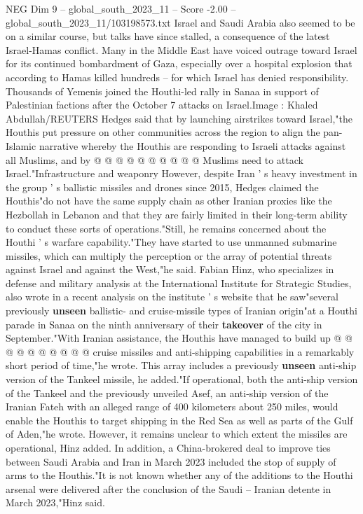 \begin{textsample}{NEG Dim 9 – global\_south\_2023\_11 – Score -2.00 – global\_south\_2023\_11/103198573.txt}
Israel and Saudi Arabia also seemed to be on a similar course, but talks have since stalled, a consequence of the latest Israel-Hamas conflict.
Many in the Middle East have voiced outrage toward Israel for its continued bombardment of Gaza, especially over a hospital explosion that according to Hamas killed hundreds -- for which Israel has denied responsibility.
Thousands of Yemenis joined the Houthi-led rally in Sanaa in support of Palestinian factions after the October 7 attacks on Israel.Image : Khaled Abdullah/REUTERS Hedges said that by launching airstrikes toward Israel,"the Houthis put pressure on other communities across the region to align the pan-Islamic narrative whereby the Houthis are responding to Israeli attacks against all Muslims, and by @ @ @ @ @ @ @ @ @ @ Muslims need to attack Israel."Infrastructure and weaponry However, despite Iran ' s heavy investment in the group ' s ballistic missiles and drones since 2015, Hedges claimed the Houthis"do not have the same supply chain as other Iranian proxies like the Hezbollah in Lebanon and that they are fairly limited in their long-term ability to conduct these sorts of operations."Still, he remains concerned about the Houthi ' s warfare capability."They have started to use unmanned submarine missiles, which can multiply the perception or the array of potential threats against Israel and against the West,"he said.
Fabian Hinz, who specializes in defense and military analysis at the International Institute for Strategic Studies, also wrote in a recent analysis on the institute ' s website that he saw"several previously \textbf{unseen} ballistic- and cruise-missile types of Iranian origin"at a Houthi parade in Sanaa on the ninth anniversary of their \textbf{takeover} of the city in September."With Iranian assistance, the Houthis have managed to build up @ @ @ @ @ @ @ @ @ @ cruise missiles and anti-shipping capabilities in a remarkably short period of time,"he wrote.
This array includes a previously \textbf{unseen} anti-ship version of the Tankeel missile, he added."If operational, both the anti-ship version of the Tankeel and the previously unveiled Asef, an anti-ship version of the Iranian Fateh with an alleged range of 400 kilometers about 250 miles, would enable the Houthis to target shipping in the Red Sea as well as parts of the Gulf of Aden,"he wrote.
However, it remains unclear to which extent the missiles are operational, Hinz added.
In addition, a China-brokered deal to improve ties between Saudi Arabia and Iran in March 2023 included the stop of supply of arms to the Houthis."It is not known whether any of the additions to the Houthi arsenal were delivered after the conclusion of the Saudi -- Iranian detente in March 2023,"Hinz said.

\end{textsample}
